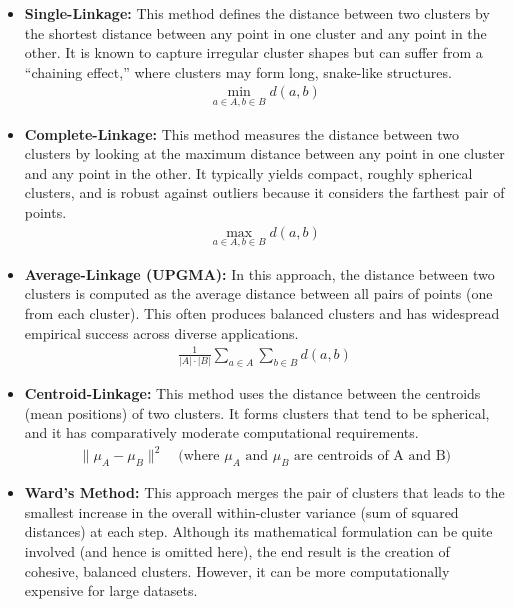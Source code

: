 \begin{itemize}
  \item \textbf{Single-Linkage:} This method defines the distance
    between two clusters by the shortest distance between any point
    in one cluster and any point in the other. It is known to capture
    irregular cluster shapes but can suffer from a “chaining effect,”
    where clusters may form long, snake-like structures.
    \begin{align*}
      \min_{a \in A, b \in B} d(a, b)
    \end{align*}

  \item \textbf{Complete-Linkage:} This method measures the distance
    between two clusters by looking at the maximum distance between
    any point in one cluster and any point in the other. It typically
    yields compact, roughly spherical clusters, and is robust against
    outliers because it considers the farthest pair of points.
    \begin{align*}
      \max_{a \in A, b \in B} d(a, b)
    \end{align*}

  \item \textbf{Average-Linkage (UPGMA):} In this approach, the
    distance between two clusters is computed as the average distance
    between all pairs of points (one from each cluster). This often
    produces balanced clusters and has widespread empirical success
    across diverse applications.
    \begin{align*}
      \frac{1}{|A| \cdot |B|} \sum_{a \in A} \sum_{b \in B} d(a, b)
    \end{align*}

  \item \textbf{Centroid-Linkage:} This method uses the distance
    between the centroids (mean positions) of two clusters. It forms
    clusters that tend to be spherical, and it has comparatively
    moderate computational requirements.
    \begin{align*}
      \| \mu_A - \mu_B \|^2
      \quad \text{(where $\mu_A$ and $\mu_B$ are centroids of A and B)}
    \end{align*}

  \item \textbf{Ward’s Method:} This approach merges the pair of
    clusters that leads to the smallest increase in the overall
    within-cluster variance (sum of squared distances) at each step.
    Although its mathematical formulation can be quite involved (and
    hence is omitted here), the end result is the creation of cohesive,
    balanced clusters. However, it can be more computationally
    expensive for large datasets.
\end{itemize}

